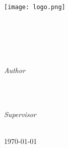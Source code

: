 %
%
%
%
%
%

\begin{titlepage}
	\centering
	\thispagestyle{empty}
	\begin{center}
	\texttt{[image: logo.png]}
	\end{center}
	\vfill
	\textsc{\Large{\emph{\mycourse}}}\\[0.5cm]
	\HRule\\[0.4cm]
	\vspace{8mm}
	\huge{\textbf{{\selectfont
	\myMaintitle}}}\\
	\HRule\\[0.4cm]
	\vspace{9mm}

	\begin{minipage}{0.4\textwidth}
		\begin{flushleft}
			\large
			\textit{Author}\\
			\textsc{\myName}\\ %
			\textsc{\myMatrikel} %
		\end{flushleft}
	\end{minipage}
	~
	\begin{minipage}{0.4\textwidth}
		\begin{flushright}
			\large
			\textit{Supervisor}\\
			\textsc{\fistSupervisor}\\ %
			\textsc{\secSupervisor} %
		\end{flushright}
	\end{minipage}

	\vspace{5cm}
	\large{\today}
	\vfill
	\end{titlepage}
	\newpage
